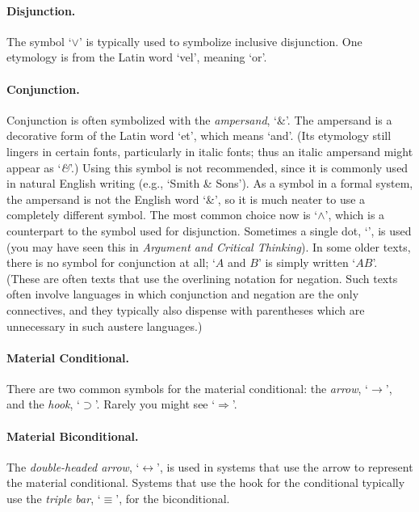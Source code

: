 \paragraph{Disjunction.} The symbol `$\vee$' is typically used to symbolize inclusive disjunction. One etymology is from the Latin word `vel', meaning `or'.%

\paragraph{Conjunction.}
Conjunction is often symbolized with the \emph{ampersand}, `{\&}'. The ampersand is a decorative form of the Latin word `et', which means `and'.  (Its etymology still lingers in certain fonts, particularly in italic fonts; thus an italic ampersand might appear as `\emph{\&}'.) Using this symbol is not recommended, since it is commonly used in natural English writing (e.g., `Smith \& Sons'). As a symbol in a formal system, the ampersand is not the English word `\&', so it is much neater to use a completely different symbol. The most common choice now is `$\wedge$', which is a counterpart to the symbol used for disjunction. Sometimes a single dot, `{\scriptsize\textbullet}', is used (you may have seen this in \emph{Argument and Critical Thinking}). In some older texts, there is no symbol for conjunction at all; `$A$ and $B$' is simply written `$AB$'. (These are often texts that use the overlining notation for negation. Such texts often involve languages in which conjunction and negation are the only connectives, and they typically also dispense with parentheses which are unnecessary in such austere languages.)

\paragraph{Material Conditional.} There are two common symbols for the material conditional: the \emph{arrow}, `$\rightarrow$', and the \emph{hook}, `$\supset$'. Rarely you might see `$\Rightarrow$'.

\paragraph{Material Biconditional.} The \emph{double-headed arrow}, `$\leftrightarrow$', is used in systems that use the arrow to represent the material conditional. Systems that use the hook for the conditional typically use the \emph{triple bar}, `$\equiv$', for the biconditional.

